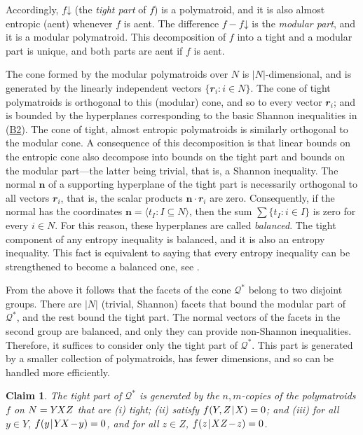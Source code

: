 \documentclass[reqno]{amsart}
\newtheorem{claim}[theorem]{Claim}
\theoremstyle{definition}
\newcommand\tsp{\mkern 1.5mu}
\def\|{\mkern1.5mu{|}\mkern1.5mu}
\def\r{\mathbfit r}
\newcommand\dn{\mathord{\downarrow}}
\def\sm{\tsp{-}\tsp} %
\def\YXZ{Y\mkern-2mu XZ}
\def\YX{Y\mkern-2mu X}
\newcommand\bref[1]{\hyperlink{#1}{#1}}
\begin{document}
Accordingly, $f\dn$ (the \emph{tight part} of $f$) is a polymatroid, and it
is also almost entropic (aent) whenever $f$ is aent. The difference $f-f\dn$
is the \emph{modular part}, and it is a modular polymatroid. This
decomposition of $f$ into a tight and a modular part is unique, and both
parts are aent if $f$ is aent.

The cone formed by the modular polymatroids over $N$ is $|N|$-dimensional,
and is generated by the linearly independent vectors $\{\r_i:i\in N\}$. The
cone of tight polymatroids is orthogonal to this (modular) cone, and so to
every vector $\r_i$; and is bounded by the hyperplanes corresponding to the
basic Shannon inequalities in (\bref{B2}). The cone of tight, almost
entropic polymatroids is similarly orthogonal to the modular cone. A
consequence of this decomposition is that linear bounds on the entropic cone
also decompose into bounds on the tight part and bounds on the modular
part---the latter being trivial, that is, a Shannon inequality. The normal
$\mathbf n$ of a supporting hyperplane of the tight part is necessarily
orthogonal to all vectors $\r_i$, that is, the scalar products $\mathbf
n\cdot \r_i$ are zero. Consequently, if the normal has the coordinates
$\mathbf n=\langle t_I:I\subseteq N\rangle$, then the sum $\sum \{ t_I: i\in
I\}$ is zero for every $i\in N$. For this reason, these hyperplanes are
called \emph{balanced}. The tight component of any entropy inequality is
balanced, and it is also an entropy inequality. This fact is equivalent to
saying that every entropy inequality can be strengthened to become a
balanced one, see \cite{balanced}.

\smallskip
From the above it follows that the facets of the cone $\mathcal
Q^*$ belong to two disjoint groups. There are $|N|$ (trivial, Shannon)
facets that bound the modular part of $\mathcal Q^*$, and the rest
bound the tight part. The normal vectors of the facets in the second
group are balanced, and only they can provide non-Shannon inequalities.
Therefore, it suffices to consider only the tight part of $\mathcal Q^*$.
This part is generated by a smaller collection of polymatroids, has
fewer dimensions, and so can be handled more efficiently.

\begin{claim}\label{claim:reduction1}
The tight part of $\mathcal Q^*$ is generated by the $n,m$-copies of the
polymatroids $f$ on $N=\YXZ$ that are
{\upshape(i)} tight;
{\upshape(ii)} satisfy $f(Y,Z\|X)=0$; and
{\upshape(iii)} for all $y\in Y$, $f(y\|\YX\sm y)=0$, and for all
$z\in Z$, $f(z\|XZ\sm z)=0$.
\end{claim}
\end{document}
